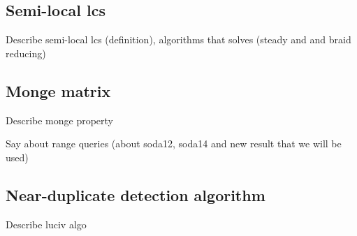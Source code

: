 \subsection{Semi-local lcs}

Describe semi-local lcs (definition), algorithms that solves (steady and and braid reducing)

\subsection{Monge matrix}
Describe monge property  


Say about range queries (about soda12, soda14 and new result that we will be used)

\subsection{Near-duplicate detection algorithm}

Describe luciv algo

